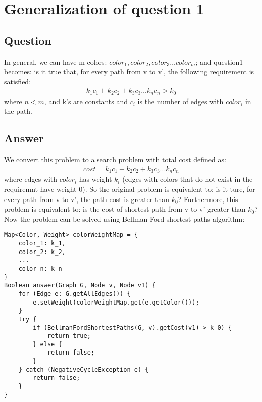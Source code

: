 \documentclass{article}
\begin{document}
\section{Generalization of question 1}
\subsection{Question}
In general, we can have m colors: $color_1, color_2, color_3 \ldots color_m$;
and question1 becomes: is it true that, for every path from v to v', the
following requirement is satisfied:
\begin{align*}
k_1c_1 + k_2c_2 + k_3c_3 \ldots k_nc_n > k_0
\end{align*}
where $n < m$, and k's are constants and $c_i$ is the number of edges with
$color_i$ in the path.
\subsection{Answer}
We convert this problem to a search problem with total cost defined as:
\begin{align*}
cost = k_1c_1 + k_2c_2 + k_3c_3 ... k_nc_n
\end{align*}
where edges with $color_i$ has weight $k_i$ (edges with colors that do not
exist in the requiremnt have weight 0). So the original problem is equivalent
to: is it ture, for every path from v to v', the path cost is greater than
$k_0$? Furthermore, this problem is equivalent to: is the cost of shortest path
from v to v' greater than $k_0$? Now the problem can be solved using
Bellman-Ford shortest paths algorithm:
\begin{lstlisting}
Map<Color, Weight> colorWeightMap = {
	color_1: k_1,
	color_2: k_2,
	...
	color_n: k_n
}
Boolean answer(Graph G, Node v, Node v1) {
	for (Edge e: G.getAllEdges()) {
		e.setWeight(colorWeightMap.get(e.getColor()));
	}
	try {
		if (BellmanFordShortestPaths(G, v).getCost(v1) > k_0) {
			return true;
		} else {
			return false;
		}
	} catch (NegativeCycleException e) {
		return false;
	}
}
\end{lstlisting}
\end{document}
